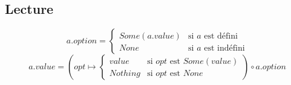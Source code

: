	\subsection*{Lecture}
	
		\[
			a.option = \begin{cases}
				Some(a.value) & \text{si } a \text{ est défini}\\
				None & \text{si } a \text{ est indéfini}
			\end{cases}
		\]
		\[
			a.value = \left(opt \mapsto \begin{cases}
				value & \text{si } opt \text{ est } Some(value)\\
				Nothing & \text{si } opt \text{ est } None
			\end{cases}\right) \circ a.option
		\]
